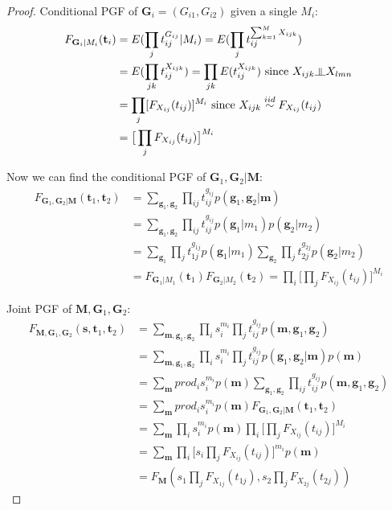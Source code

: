 \documentclass{article}
\newcommand{\indep}{\rotatebox[origin=c]{90}{$\models$}}
\begin{document}
\begin{proof}
Conditional PGF of $\mathbf{G}_{i} = (G_{i1}, G_{i2})$ given a single $M_i$:
\begin{align*}
F_{\mathbf{G}_{i}|M_i}(\mathbf{t}_i)
&= E(\prod_j t_{ij}^{G_{ij}}|M_i) = E(\prod_j t_{ij}^{\sum_{k=1}^M X_{ijk}}) \\
&= E(\prod_{jk} t_{ij}^{X_{ijk}}) = \prod_{jk} E(t_{ij}^{X_{ijk}}) \text{ since $X_{ijk} \indep X_{lmn}$} \\
&= \prod_{j} [F_{X_{ij}}(t_{ij})]^{M_i} \text{ since $X_{ijk} \stackrel{iid}{\sim} F_{X_{ij}}(t_{ij})$} \\
&= \big[ \prod_{j} F_{X_{ij}}(t_{ij}) \big]^{M_i}
\end{align*}

Now we can find the conditional PGF of $\mathbf{G}_1, \mathbf{G}_2|\mathbf{M}$:
\begin{align*}
F_{\mathbf{G}_1, \mathbf{G}_2|\mathbf{M}}(\mathbf{t}_1, \mathbf{t}_2)
&= \sum_{\mathbf{g}_1, \mathbf{g}_2} \prod_{ij} t_{ij}^{g_{ij}} p(\mathbf{g}_1, \mathbf{g}_2|\mathbf{m}) \\
&= \sum_{\mathbf{g}_1, \mathbf{g}_2} \prod_{ij} t_{ij}^{g_{ij}} p(\mathbf{g}_1|m_1) p(\mathbf{g}_2|m_2) \\
&= \sum_{\mathbf{g}_1} \prod_j t_{1j}^{g_{1j}} p(\mathbf{g}_1|m_1) \sum_{\mathbf{g}_2} \prod_j t_{2j}^{g_{2j}} p(\mathbf{g}_2|m_2) \\
&= F_{\mathbf{G}_1|M_1}(\mathbf{t}_1) F_{\mathbf{G}_2|M_2}(\mathbf{t}_2)
= \prod_i \big[ \prod_j F_{X_{ij}}(t_{ij}) \big]^{M_i}
\end{align*}

Joint PGF of $\mathbf{M}, \mathbf{G}_1, \mathbf{G}_2$:
\begin{align*}
F_{\mathbf{M}, \mathbf{G}_1, \mathbf{G}_2}(\mathbf{s}, \mathbf{t}_1, \mathbf{t}_2)
&= \sum_{\mathbf{m}, \mathbf{g}_1, \mathbf{g}_2}
\prod_i s_i^{m_i} \prod_j t_{ij}^{g_{ij}} p(\mathbf{m}, \mathbf{g}_1, \mathbf{g}_2) \\
&= \sum_{\mathbf{m}, \mathbf{g}_1, \mathbf{g}_2} \prod_i s_i^{m_i}
\prod_j t_{ij}^{g_{ij}} p(\mathbf{g}_1, \mathbf{g}_2|\mathbf{m}) p(\mathbf{m}) \\
&= \sum_{\mathbf{m}} prod_i s_i^{m_i} p(\mathbf{m})
\sum_{\mathbf{g}_1, \mathbf{g}_2} \prod_{ij} t_{ij}^{g_{ij}} p(\mathbf{m}, \mathbf{g}_1, \mathbf{g}_2) \\
&= \sum_{\mathbf{m}} prod_i s_i^{m_i} p(\mathbf{m})
F_{\mathbf{G}_1, \mathbf{G}_2|\mathbf{M}}(\mathbf{t}_1, \mathbf{t}_2) \\
&= \sum_{\mathbf{m}} \prod_i s_i^{m_i} p(\mathbf{m}) \prod_i \big[ \prod_j F_{X_{ij}}(t_{ij}) \big]^{M_i} \\
&= \sum_{\mathbf{m}} \prod_i \big[ s_i \prod_j F_{X_{ij}}(t_{ij}) \big]^{m_i} p(\mathbf{m}) \\
&= F_{\mathbf{M}}(s_1 \prod_j F_{X_{1j}}(t_{1j}), s_2 \prod_j F_{X_{2j}}(t_{2j}))
\end{align*}


\end{proof}
\end{document}
